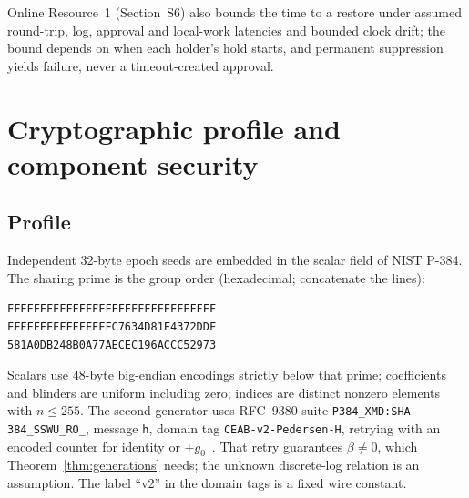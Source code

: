 \documentclass[pdflatex,sn-mathphys-num]{sn-jnl}%
\theoremstyle{plain}
\theoremstyle{definition}
\newcommand{\code}[1]{\texttt{#1}}
\begin{document}
Online Resource~1 (Section~S6) also bounds the time to a restore under assumed round-trip, log, approval and local-work latencies and bounded clock drift; the bound depends on when each holder's hold starts, and permanent suppression yields failure, never a timeout-created approval.


\section{Cryptographic profile and component security}\label{sec:crypto}

\subsection{Profile}\label{sec:profile}
Independent 32-byte epoch seeds are embedded in the scalar field of NIST P-384. The sharing prime is the group order (hexadecimal; concatenate the lines):
\begin{Verbatim}[fontsize=\small]
FFFFFFFFFFFFFFFFFFFFFFFFFFFFFFFF
FFFFFFFFFFFFFFFFC7634D81F4372DDF
581A0DB248B0A77AECEC196ACCC52973
\end{Verbatim}
Scalars use 48-byte big-endian encodings strictly below that prime; coefficients and blinders are uniform including zero; indices are distinct nonzero elements with $n\le255$. The second generator uses RFC~9380 suite \code{P384\_XMD:SHA-384\_SSWU\_RO\_}, message \code{h}, domain tag \code{CEAB-v2-Pedersen-H}, retrying with an encoded counter for identity or $\pm g_0$~\cite{rfc9380,sec2}. That retry guarantees $\beta\ne0$, which Theorem~\ref{thm:generations} needs; the unknown discrete-log relation is an assumption. The label ``v2'' in the domain tags is a fixed wire constant.
\end{document}
